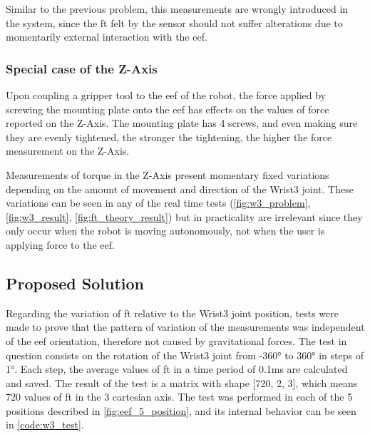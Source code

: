 \par Similar to the previous problem, this measurements are wrongly introduced in the system, since the \ac{ft} felt by the sensor should not suffer alterations due to momentarily external interaction with the \ac{eef}.

\subsubsection{Special case of the Z-Axis}

\par Upon coupling a gripper tool to the \ac{eef} of the robot, the force applied by screwing the mounting plate onto the \ac{eef} has effects on the values of force reported on the Z-Axis. The mounting plate has 4 screws, and even making sure they are evenly tightened, the stronger the tightening, the higher the force measurement on the Z-Axis.

\par Measurements of torque in the Z-Axis present momentary fixed variations depending on the amount of movement and direction of the Wrist3 joint. These variations can be seen in any of the real time tests (\autoref{fig:w3_problem}, \autoref{fig:w3_result}, \autoref{fig:ft_theory_result}) but in practicality are irrelevant since they only occur when the robot is moving autonomously, not when the user is applying force to the \ac{eef}.

\subsection{Proposed Solution}
\label{ssec:w3_solution}

\par Regarding the variation of \ac{ft} relative to the Wrist3 joint position, tests were made to prove that the pattern of variation of the measurements was independent of the \ac{eef} orientation, therefore not caused by gravitational forces. The test in question consists on the rotation of the Wrist3 joint from \ang{-360} to \ang{360} in steps of \ang{1}. Each step, the average values of \ac{ft} in a time period of 0.1ms are calculated and saved. The result of the test is a matrix with shape [720, 2, 3], which means 720 values of \ac{ft} in the 3 cartesian axis. The test was performed in each of the 5 positions described in \autoref{fig:eef_5_position}, and its internal behavior can be seen in \autoref{code:w3_test}.

